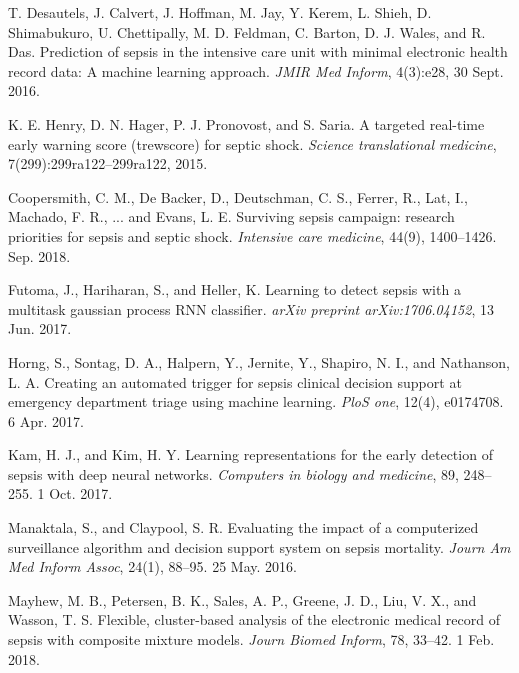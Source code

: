 \documentclass{amia}
\begin{document}

\begin{thebibliography}{1}
\setlength\itemsep{-0.1em}

	T. Desautels, J. Calvert, J. Hoffman, M. Jay, Y. Kerem, L. Shieh,
	D. Shimabukuro, U. Chettipally, M. D. Feldman, C. Barton, D. J. Wales,
	and R. Das. Prediction of sepsis in the intensive care unit with minimal
	electronic health record data: A machine learning approach. 
	{\it JMIR Med Inform}, 4(3):e28, 30 Sept. 2016.


	K. E. Henry, D. N. Hager, P. J. Pronovost, and S. Saria. A targeted
	real-time early warning score (trewscore) for septic shock. 
	{\it Science translational medicine}, 7(299):299ra122--299ra122, 2015.

        Coopersmith, C. M., De Backer, D., Deutschman, C. S., Ferrer, R., Lat, I., Machado, F. R., 
        ... and Evans, L. E. Surviving sepsis campaign: research priorities for sepsis and septic shock. 
        {\it Intensive care medicine}, 44(9), 1400--1426. Sep. 2018.

        Futoma, J., Hariharan, S., and Heller, K. Learning to detect sepsis with a multitask gaussian 
        process RNN classifier. {\it arXiv preprint arXiv:1706.04152}, 13 Jun. 2017.

        Horng, S., Sontag, D. A., Halpern, Y., Jernite, Y., Shapiro, N. I., and Nathanson, L. A. 
        Creating an automated trigger for sepsis clinical decision support at emergency department 
        triage using machine learning. {\it PloS one}, 12(4), e0174708. 6 Apr. 2017.

        Kam, H. J., and Kim, H. Y. Learning representations for the early detection of sepsis with deep neural 
        networks. {\it Computers in biology and medicine}, 89, 248--255. 1 Oct. 2017.

        Manaktala, S., and Claypool, S. R. Evaluating the impact of a computerized surveillance algorithm and 
        decision support system on sepsis mortality. {\it Journ Am Med Inform Assoc}, 
        24(1), 88--95. 25 May. 2016.

        Mayhew, M. B., Petersen, B. K., Sales, A. P., Greene, J. D., Liu, V. X., and Wasson, T. S. 
        Flexible, cluster-based analysis of the electronic medical record of sepsis with 
        composite mixture models. {\it Journ Biomed Inform}, 78, 33--42. 1 Feb. 2018.


\end{thebibliography}
\end{document}
